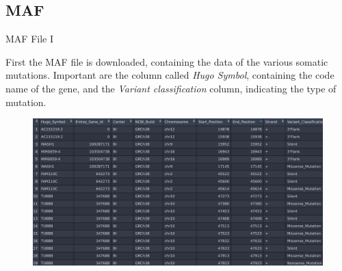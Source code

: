 \documentclass{beamer}
\begin{document}
\subsection{MAF}
\begin{frame}{MAF File I}
  \begin{block}{}
    First the MAF file is downloaded, containing the data of the various somatic
    mutations. Important are the column called \textit{Hugo Symbol}, containing
    the code name of the gene, and the \textit{Variant classification} column,
    indicating the type of mutation.  
  \end{block}
  \begin{figure}
    \centering
    \includegraphics[scale = 0.15]{img/maf_r.jpg}
  \end{figure}
\end{frame}
\end{document}

